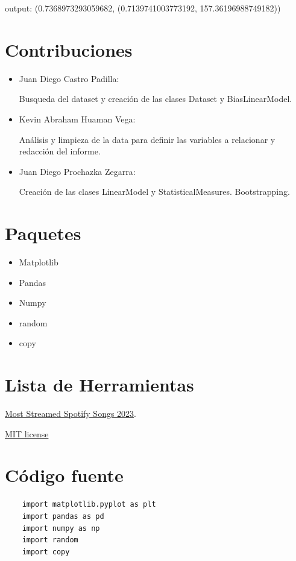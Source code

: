 \documentclass{report}
\begin{document}
        output:
        (0.7368973293059682, (0.7139741003773192, 157.36196988749182))

\chapter{Contribuciones}
        \begin{itemize}
            \item Juan Diego Castro Padilla:

            Busqueda del dataset y creaci\'on de las clases Dataset y BiasLinearModel.
            \item Kevin Abraham Huaman Vega:

            An\'alisis y limpieza de la data para definir las variables a relacionar y redacci\'on del informe.

            \item Juan Diego Prochazka Zegarra:

            Creaci\'on de las clases LinearModel y StatisticalMeasures. Bootstrapping.

            \end{itemize}
\chapter{Paquetes}
    \begin{itemize}
        \item Matplotlib
        \item Pandas
        \item Numpy
        \item random
        \item copy
    \end{itemize}

\chapter{Lista de Herramientas}
    \subtitle{Dataset}
        \href{https://www.kaggle.com/datasets/nelgiriyewithana/top-spotify-songs-2023}{Most Streamed Spotify Songs 2023}.

    \subtitle{Licence}
        \href{https://opensource.org/license/mit/}{MIT license}
\chapter{C\'odigo fuente}
    \subtitle{Importar las librer\'ias}
    \begin{lstlisting}
    import matplotlib.pyplot as plt
    import pandas as pd
    import numpy as np
    import random
    import copy
    \end{lstlisting}
\end{document}

